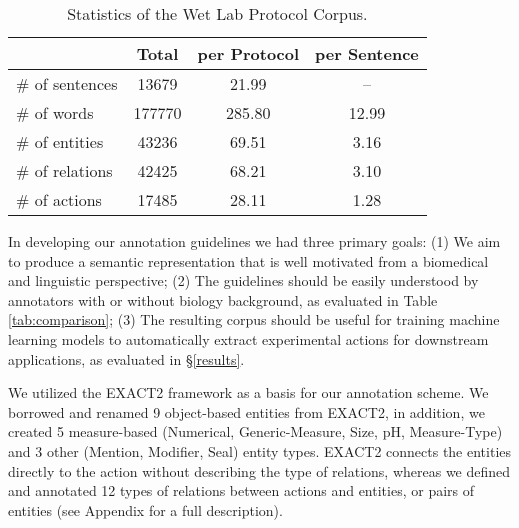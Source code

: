 \documentclass[11pt,a4paper]{article}
\begin{document}
\begin{table}[ht!]
\small
\begin{tabular}{|l||c|c|c|}
 \hline
  & Total & per Protocol & per Sentence\\
 \hline
        \# of sentences & 13679  & 21.99     & --\\
        \# of words     & 177770 & 285.80    & 12.99\\
        \hline
        \# of entities  & 43236 & 69.51 & 3.16\\
        \# of relations & 42425 & 68.21 & 3.10\\
        \# of actions   & 17485 & 28.11 & 1.28\\
 \hline
\end{tabular}
\caption{Statistics of the Wet Lab Protocol Corpus.}
    \label{tab:corpus_stats}
    \vspace{.16in}
\end{table}



In developing our annotation guidelines we had three primary goals: (1) We aim to produce a semantic representation that is well motivated from a biomedical and linguistic perspective; (2) The guidelines should be easily understood by annotators with or without biology background, as evaluated in Table \ref{tab:comparison}; (3) The resulting corpus should be useful for training machine learning models to automatically extract experimental actions for downstream applications, as evaluated in \S \ref{results}.%


We utilized the EXACT2 framework \cite{soldatova2014exact2} as a basis for our annotation scheme. We borrowed and renamed 9 object-based entities from EXACT2, in addition, we created 5 measure-based 
({\sc Numerical}, {\sc Generic-Measure}, {\sc Size}, {\sc pH}, {\sc Measure-Type}) and 3 other ({\sc Mention}, {\sc Modifier},  {\sc Seal}) 
entity types. EXACT2 connects the entities directly to the action without describing the type of relations, whereas we defined and annotated 12 types of relations between actions and entities, or pairs of entities (see Appendix for a full description).


\end{document}
